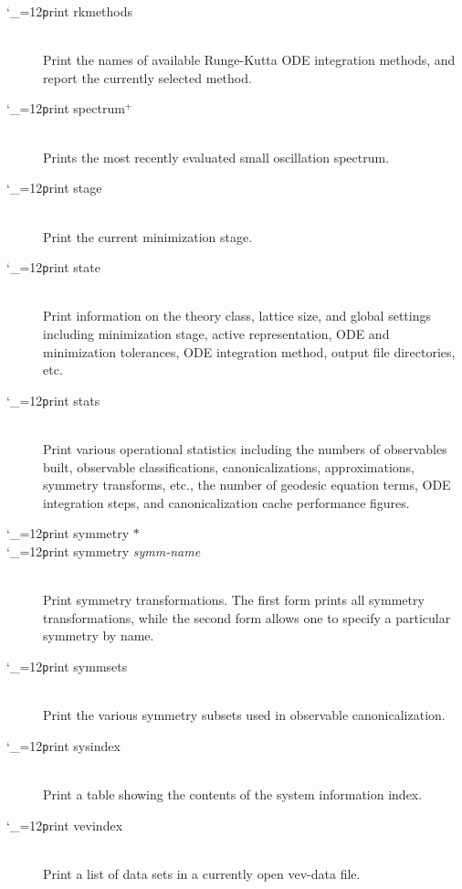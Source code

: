 \documentclass [12pt]{article}
\makeatletter
\renewcommand{\tt}{\begingroup\catcode`_=12\def\_{\string_}\tt@}
\newcommand{\tt@}[1]{\texttt{#1}\endgroup}
\makeatother
\begin{document}
\begin{description}
\item [\tt print rkmethods]~\\
    Print the names of available Runge-Kutta ODE integration methods,
    and report the currently selected method.

\item [\tt print spectrum$^+$]~\\
    Prints the most recently evaluated small oscillation spectrum.

\item [\tt print stage]~\\
    Print the current minimization stage.

\item [\tt print state]~\\
    Print information on the theory class, lattice size,
    and global settings including
    minimization stage, active representation,
    ODE and minimization tolerances, ODE integration method,
    output file directories, etc.

\item [\tt print stats]~\\
    Print various operational statistics including the
    numbers of observables built, observable classifications,
    canonicalizations,
    approximations, symmetry transforms, etc., the number of geodesic
    equation terms, ODE integration steps, and canonicalization cache
    performance figures.

\item [\tt print symmetry $*$] \bgroup \itemsep 0pt \parskip 0pt
\item [\tt print symmetry {\it symm-name}]~\\
    Print symmetry transformations.
    The first form prints all symmetry transformations,
    while the second form allows one to specify a particular symmetry
    by name.
\egroup

\item [\tt print symmsets]~\\
    Print the various symmetry subsets used in observable canonicalization.

\item [\tt print sysindex]~\\
    Print a table showing the contents of the system information index.

\item [\tt print vevindex]~\\
    Print a list of data sets in
    a currently open vev-data file.


\end{description}
\end{document}
